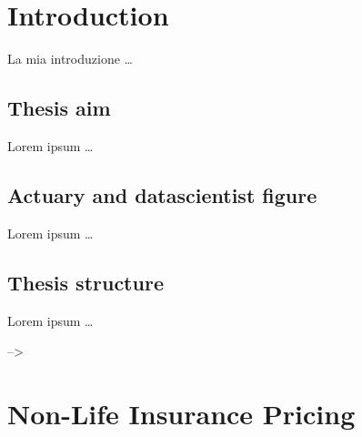 \documentclass[a4paper, nobind]{templates/ociamthesis}
\theoremstyle{definition}
\theoremstyle{definition}
\theoremstyle{definition}
\theoremstyle{remark}
\begin{document}
\hypersetup{
    linkcolor=darkblue,
}

\flushbottom

\hypertarget{introduction}{%
\chapter*{Introduction}\label{introduction}}

\adjustmtc

La mia introduzione \ldots{}

\hypertarget{thesis-aim}{%
\section*{Thesis aim}\label{thesis-aim}}

Lorem ipsum \ldots{}

\hypertarget{actuary-and-datascientist-figure}{%
\section*{Actuary and datascientist figure}\label{actuary-and-datascientist-figure}}

Lorem ipsum \ldots{}

\hypertarget{thesis-structure}{%
\section*{Thesis structure}\label{thesis-structure}}

Lorem ipsum \ldots{}

--\textgreater{}

\hypertarget{chap:nlip-ita-market}{%
\chapter{\texorpdfstring{\textbf{Non-Life Insurance Pricing}}{Non-Life Insurance Pricing}}\label{chap:nlip-ita-market}}

\minitoc  

\end{document}
